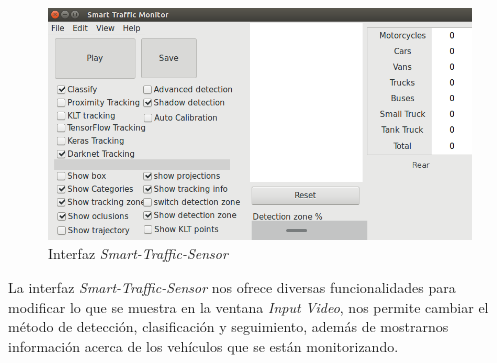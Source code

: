 \begin{itemize}
\begin{figure}[H]
    \begin{center}
    	\includegraphics[scale=0.5]{figures/Diseno_global/interfaz_grafica.png}
       \caption{Interfaz \textit{
       Smart-Traffic-Sensor}}
    	\label{fig.interfaz_sts}
    \end{center}
    \end{figure}
\end{itemize}

La interfaz \textit{Smart-Traffic-Sensor} nos ofrece diversas funcionalidades para modificar lo que se muestra en la ventana \textit{Input Video}, nos permite cambiar el método de detección, clasificación y seguimiento, además de mostrarnos información acerca de los vehículos que se están monitorizando.

